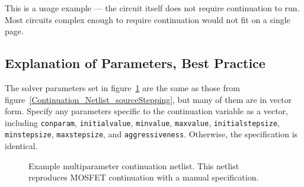 This is a usage example --- the circuit itself does not require continuation to run. Most circuits complex enough to require continuation would not fit on a single page.  

\subsection{Explanation of Parameters, Best Practice}

The solver parameters set in figure~\ref{Continuation_Netlist_multiParam} are 
the same as those from figure~\ref{Continuation_Netlist_sourceStepping}, but many of them
are in vector form.  Specify any parameters specific to the 
continuation variable as a vector, including \texttt{conparam}, \texttt{initialvalue},
 \texttt{minvalue}, \texttt{maxvalue}, \texttt{initialstepsize},
 \texttt{minstepsize}, \texttt{maxstepsize}, and \texttt{aggressiveness}.
Otherwise, the specification is identical.

\begin{figure}[htbp]
\begin{centering}
\caption [Example multiparameter continuation netlist]{Example multiparameter continuation netlist. 
This netlist reproduces MOSFET continuation with a manual specification. \label{Continuation_Netlist_multiParam}}


\end{centering}
\end{figure}




